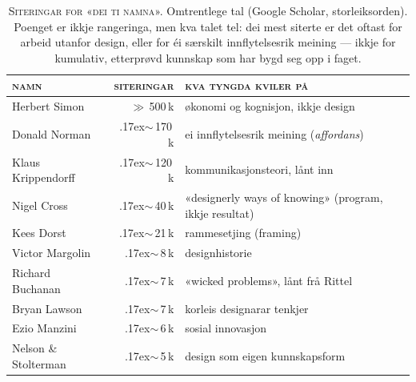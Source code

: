 \begin{table}[t]
\centering
\small
\begin{tabular}{@{}p{42mm}rp{58mm}@{}}
\toprule
\textsc{namn} & \textsc{siteringar} & \textsc{kva tyngda kviler på} \\
\midrule
Herbert Simon        & $\gg$\,500\,k & økonomi og kognisjon, ikkje design \\[2pt]
Donald Norman        & {\raise.17ex\hbox{$\scriptstyle\sim$}}\,170\,k & ei innflytelsesrik meining (\emph{affordans}) \\[2pt]
Klaus Krippendorff   & {\raise.17ex\hbox{$\scriptstyle\sim$}}\,120\,k & kommunikasjonsteori, lånt inn \\[2pt]
Nigel Cross          & {\raise.17ex\hbox{$\scriptstyle\sim$}}\,40\,k & «designerly ways of knowing» (program, ikkje resultat) \\[2pt]
Kees Dorst           & {\raise.17ex\hbox{$\scriptstyle\sim$}}\,21\,k & rammesetjing (framing) \\[2pt]
Victor Margolin      & {\raise.17ex\hbox{$\scriptstyle\sim$}}\,8\,k & designhistorie \\[2pt]
Richard Buchanan     & {\raise.17ex\hbox{$\scriptstyle\sim$}}\,7\,k & «wicked problems», lånt frå Rittel \\[2pt]
Bryan Lawson         & {\raise.17ex\hbox{$\scriptstyle\sim$}}\,7\,k & korleis designarar tenkjer \\[2pt]
Ezio Manzini         & {\raise.17ex\hbox{$\scriptstyle\sim$}}\,6\,k & sosial innovasjon \\[2pt]
Nelson \& Stolterman & {\raise.17ex\hbox{$\scriptstyle\sim$}}\,5\,k & design som eigen kunnskapsform \\
\bottomrule
\end{tabular}
\caption{\textsc{Siteringar for «dei ti namna».} Omtrentlege tal (Google Scholar, storleiksorden). Poenget er ikkje rangeringa, men kva talet tel: dei mest siterte er det oftast for arbeid utanfor design, eller for éi særskilt innflytelsesrik meining --- ikkje for kumulativ, etterprøvd kunnskap som har bygd seg opp i faget.}
\end{table}
